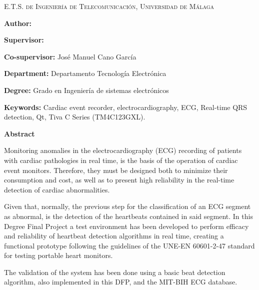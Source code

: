 
\pagestyle{fancy}

\begin{center}
	\scshape
	E.T.S. de Ingeniería de Telecomunicación, Universidad de Málaga
\end{center}

\bigskip

\begin{center}
	\Large \scshape
	\textbf{\tfgtitlenameENG}
\end{center}

\bigskip \bigskip \bigskip

\begin{minipage}{\textwidth}

\textbf{Author:} \tfgauthorname

\medskip

\textbf{Supervisor:} \tfgtutorname

\medskip

\textbf{Co-supervisor:} José Manuel Cano García

\medskip

\textbf{Department:} Departamento Tecnología Electrónica

\medskip

\textbf{Degree:} Grado en Ingeniería de sistemas electrónicos

\medskip

\textbf{Keywords:} Cardiac event recorder, electrocardiography, ECG, Real-time QRS detection, Qt, Tiva C Series (TM4C123GXL).

\bigskip \bigskip


\end{minipage}

\begin{center}
	\textbf{Abstract}
\end{center}

Monitoring anomalies in the electrocardiography (ECG) recording of patients with cardiac pathologies in real time, is the basis of the operation of cardiac event monitors. Therefore, they must be designed both to minimize their consumption and cost, as well as to present high reliability in the real-time detection of cardiac abnormalities.

Given that, normally, the previous step for the classification of an ECG segment as abnormal, is the detection of the heartbeats contained in said segment. In this Degree Final Project a test environment has been developed to perform efficacy and reliability of heartbeat detection algorithms in real time, creating a functional prototype following the guidelines of the UNE-EN 60601-2-47 standard for testing portable heart monitors.

The validation of the system has been done using a basic beat detection algorithm, also implemented in this DFP, and the MIT-BIH ECG database.

\blankpage

